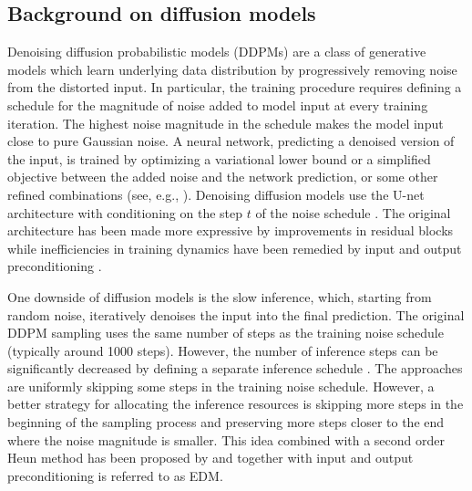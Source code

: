 \documentclass{article}
\begin{document}
\subsection{Background on diffusion models}

Denoising diffusion probabilistic models (DDPMs) \cite{ho2020denoising} are a class of generative models which learn underlying data distribution by progressively removing noise from the distorted input. In particular, the training procedure requires defining a schedule for the magnitude of noise added to model input at every training iteration. The highest noise magnitude in the schedule makes the model input close to pure Gaussian noise. A neural network, predicting a denoised version of the input, is trained by optimizing a variational lower bound or a simplified objective \cite{ho2020denoising} between the added noise and the network prediction, or some other refined combinations (see, e.g., \cite{nichol2021improved, karras2022elucidating}).
Denoising diffusion models use the U-net architecture \cite{ronneberger2015u} with conditioning on the step $t$ of the noise schedule \cite{ho2020denoising}. The original architecture has been made more expressive by improvements in residual blocks \cite{song2020score, dhariwal2021diffusion} while inefficiencies in training dynamics have been remedied by input and output preconditioning \cite{karras2022elucidating}.

One downside of diffusion models is the slow inference, which, starting from random noise, iteratively denoises the input into the final prediction. The original DDPM \cite{ho2020denoising} sampling uses the same number of steps as the training noise schedule (typically around 1000 steps). However, the number of inference steps can be significantly decreased by defining a separate inference schedule \cite{nichol2021improved,song2020denoising,karras2022elucidating}. The approaches \cite{nichol2021improved,song2020denoising} are uniformly skipping some steps in the training noise schedule. However, a better strategy for allocating the inference resources is skipping more steps in the beginning of the sampling process and preserving more steps closer to the end where the noise magnitude is smaller. This idea combined with a second order Heun method has been proposed by \cite{karras2022elucidating} and together with input and output preconditioning is referred to as EDM. 
\end{document}
